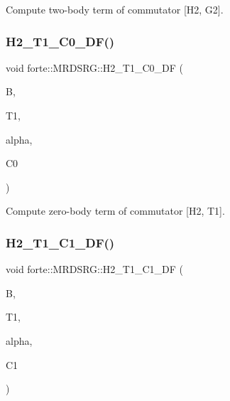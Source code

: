 Compute two-\/body term of commutator \mbox{[}H2, G2\mbox{]}. 

\mbox{\label{classforte_1_1_m_r_d_s_r_g_a35996d5d7eb2c0be1d8fd285d4ab5859}} 
\subsubsection{\texorpdfstring{H2\+\_\+\+T1\+\_\+\+C0\+\_\+\+D\+F()}{H2\_T1\_C0\_DF()}}
{\footnotesize\ttfamily void forte\+::\+M\+R\+D\+S\+R\+G\+::\+H2\+\_\+\+T1\+\_\+\+C0\+\_\+\+DF (\begin{DoxyParamCaption}\item[{Blocked\+Tensor \&}]{B,  }\item[{Blocked\+Tensor \&}]{T1,  }\item[{const double \&}]{alpha,  }\item[{double \&}]{C0 }\end{DoxyParamCaption})\hspace{0.3cm}{\ttfamily [protected]}}



Compute zero-\/body term of commutator \mbox{[}H2, T1\mbox{]}. 

\mbox{\label{classforte_1_1_m_r_d_s_r_g_a4386798a190dee103bada2500e04f66d}} 
\subsubsection{\texorpdfstring{H2\+\_\+\+T1\+\_\+\+C1\+\_\+\+D\+F()}{H2\_T1\_C1\_DF()}}
{\footnotesize\ttfamily void forte\+::\+M\+R\+D\+S\+R\+G\+::\+H2\+\_\+\+T1\+\_\+\+C1\+\_\+\+DF (\begin{DoxyParamCaption}\item[{Blocked\+Tensor \&}]{B,  }\item[{Blocked\+Tensor \&}]{T1,  }\item[{const double \&}]{alpha,  }\item[{Blocked\+Tensor \&}]{C1 }\end{DoxyParamCaption})\hspace{0.3cm}{\ttfamily [protected]}}



